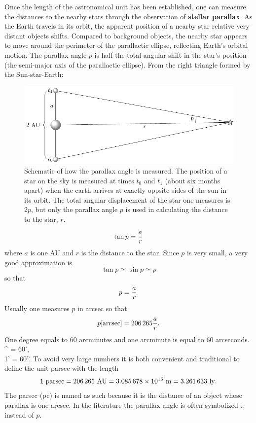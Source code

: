 Once the length of the astronomical unit has been established, one can measure the distances to the nearby stars
through the observation of {\bf stellar parallax}. As the Earth travels in its orbit, the apparent
position of a nearby star relative very distant objects shifts. Compared to background objects,
the nearby star appears to move around the perimeter of the parallactic ellipse, reflecting
Earth's orbital motion. The parallax angle $p$ is half the total angular shift in the star's
position (the semi-major axis of the parallactic ellipse). From the right triangle formed by the
Sun-star-Earth:
\begin{figure}[htpb]
	\centering
%	
	\includegraphics[width=\textwidth]{parallax-illustration.pdf}
	\caption{Schematic of how the parallax angle is measured. The position of a star on the
	sky is measured at times $t_0$ and $t_1$ (about six months apart) when the earth arrives
	at exactly oppsite sides of the sun in its orbit. The total angular displacement of the
	star one
	measures is $2p$, but only the parallax angle $p$ is used in calculating the distance to
	the star, $r$.}
	\label{fig:parallax-illustration}
\end{figure}
\[ \tan p={a\over r} \]
where $a$ is one AU and $r$ is the distance to the star. Since $p$ is very small, a very good 
approximation is \[\tan p\simeq\sin p\simeq p\] so that \[ p={a\over r}.\]
Usually one measures
$p$ in arcsec so that 
\[ p [{\rm arcsec}]=206\,265{a\over r}. \]
One degree equals to 60 arcminutes and one arcminute is equal to 60
arcseconds.
^{\circ} = 60', \\
	1' = 60''.
\eua
To avoid very large numbers it is both convenient and traditional to define the unit parsec with 
the length
\[ 1~{\rm parsec}=206\,265~{\rm AU}=3.085\,678\times 10^{16}~{\rm m}=3.261\,633~{\rm ly}. \]
The parsec (pc) is named as such because it is the distance of an object whose parallax is one arcsec. 
In the literature the parallax angle is often symbolized $\pi$ instead of $p$.

